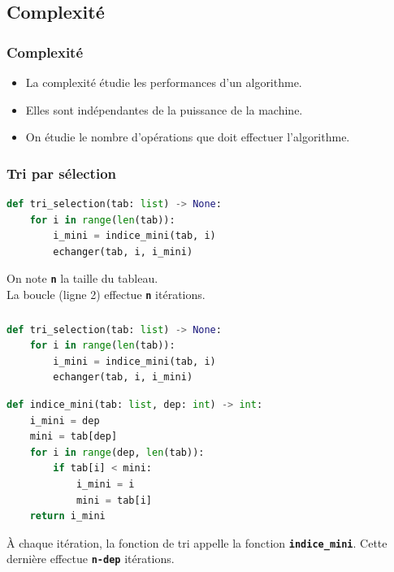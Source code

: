 \documentclass[svgnames,11pt]{beamer}
\begin{document}
\subsection{Complexité}
\begin{frame}
    \frametitle{Complexité}

    \begin{aretenir}[]
    \begin{itemize}
        \item La complexité étudie les performances d'un algorithme. 
        \item Elles sont indépendantes de la puissance de la machine. 
        \item On étudie le nombre d'opérations que doit effectuer l'algorithme.
    \end{itemize}
    \end{aretenir}

\end{frame}
\begin{frame}[fragile]
    \frametitle{Tri par sélection}

\begin{center}
\begin{lstlisting}[language=Python , basicstyle=\ttfamily\small, xleftmargin=2em, xrightmargin=0em]
def tri_selection(tab: list) -> None:
    for i in range(len(tab)):
        i_mini = indice_mini(tab, i)
        echanger(tab, i, i_mini)
\end{lstlisting}
\end{center}

\begin{aretenir}[Observation]
On note \textbf{\texttt{n}} la taille du tableau.\\La boucle (ligne 2) effectue \textbf{\texttt{n}} itérations.
\end{aretenir}
\end{frame}
\begin{frame}[fragile]
    \frametitle{}

\begin{center}
\begin{lstlisting}[language=Python , basicstyle=\ttfamily\small, xleftmargin=2em, xrightmargin=0em]
def tri_selection(tab: list) -> None:
    for i in range(len(tab)):
        i_mini = indice_mini(tab, i)
        echanger(tab, i, i_mini)
\end{lstlisting}
\begin{lstlisting}[language=Python , basicstyle=\ttfamily\small, xleftmargin=2em, xrightmargin=0em]
def indice_mini(tab: list, dep: int) -> int:
    i_mini = dep
    mini = tab[dep]
    for i in range(dep, len(tab)):
        if tab[i] < mini:
            i_mini = i
            mini = tab[i]
    return i_mini
\end{lstlisting}
\end{center}
\begin{aretenir}[Observation]
À chaque itération, la fonction de tri appelle la fonction \textbf{\texttt{indice\_mini}}. Cette dernière effectue \textbf{\texttt{n-dep}} itérations.
\end{aretenir}
\end{frame}
\end{document}
